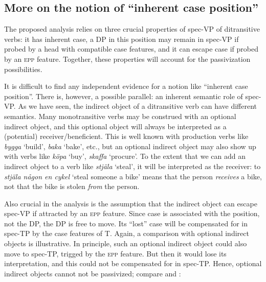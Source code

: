 \documentclass[output=paper]{langscibook}
\begin{document}
\subsection{More on the notion of “inherent case position”}\label{sec:falk:4.4}


The proposed analysis relies on three crucial properties of spec-VP of ditransitive verbs: it has inherent case, a DP in this position may remain in spec-VP if probed by a head with compatible case features, and it can escape case if probed by an \textsc{epp} feature. Together, these properties will account for the passivization possibilities.


It is difficult to find any independent evidence for a notion like “inherent case position”. There is, however, a possible parallel: an inherent semantic role of spec-VP. As we have seen, the indirect object of a ditransitive verb can have different semantics. Many monotransitive verbs may be construed with an optional indirect object, and this optional object will always be interpreted as a (potential) receiver/beneficient. This is well known with production verbs like \textit{bygga} ‘build’, \textit{baka} ‘bake’, etc., but an optional indirect object may also show up with verbs like \textit{köpa} ‘buy’, \textit{skaffa} ‘procure’. To the extent that we can add an indirect object to a verb like \textit{stjäla} ‘steal’, it will be interpreted as the receiver: to \textit{stjäla någon en cykel} ‘steal someone a bike’ means that the person \textit{receives} a bike, not that the bike is stolen \textit{from} the person. 



Also crucial in the analysis is the assumption that the indirect object can escape spec-VP if attracted by an \textsc{epp} feature. Since case is associated with the position, not the DP, the DP is free to move. Its “lost” case will be compensated for in spec-TP by the case features of T. Again, a comparison with optional indirect objects is illustrative. In principle, such an optional indirect object could also move to spec-TP, trigged by the \textsc{epp} feature. But then it would lose its interpretation, and this could not be compensated for in spec-TP. Hence, optional indirect objects cannot not be passivized; compare  and :


\ea%
    \label{ex:falk:23}
\end{document}
